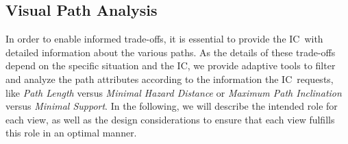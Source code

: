 \documentclass[conference,10pt,letter]{IEEEtran}
\def\IC{IC}
\begin{document}
\subsection{Visual Path Analysis} \label{sec:overview:pathanalysis}

In order to enable informed trade-offs, it is essential to provide the \IC\ with detailed information about the various paths. As the details of these trade-offs depend on the specific situation and the \IC, we provide adaptive tools to filter and analyze the path attributes according to the information the \IC\ requests, like \emph{Path Length} versus \emph{Minimal Hazard Distance} or \emph{Maximum Path Inclination} versus \emph{Minimal Support}. In the following, we will describe the intended role for each view, as well as the design considerations to ensure that each view fulfills this role in an optimal manner.
\end{document}
